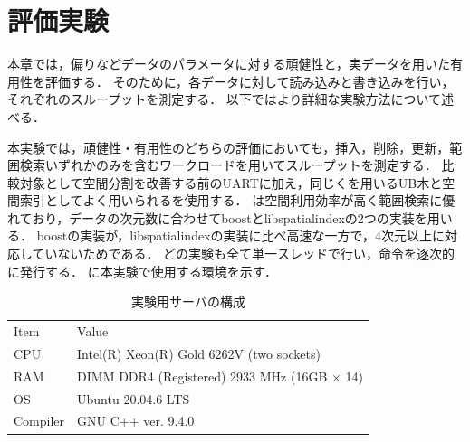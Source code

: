 \chapter{評価実験}

本章では，偏りなどデータのパラメータに対する頑健性と，実データを用いた有用性を評価する．
そのために，各データに対して読み込みと書き込みを行い，それぞれのスループットを測定する．
以下ではより詳細な実験方法について述べる．

本実験では，頑健性・有用性のどちらの評価においても，挿入，削除，更新，範囲検索いずれかのみを含むワークロードを用いてスループットを測定する．
比較対象として空間分割を改善する前のUARTに加え，同じく\ZCurve を用いるUB木と空間索引としてよく用いられる\RTree を使用する．
\RTree は空間利用効率が高く範囲検索に優れており，データの次元数に合わせてboostとlibspatialindexの2つの実装を用いる．
boostの実装が，libspatialindexの実装に比べ高速な一方で，4次元以上に対応していないためである．
どの実験も全て単一スレッドで行い，命令を逐次的に発行する．
\Tab{\ref{tab:environment}}に本実験で使用する環境を示す．

\begin{table}[tb]
  \caption{実験用サーバの構成}
  \label{tab:environment}
  \centering
  \begin{tabular}{ll}
    \toprule
    Item     & Value                                              \\
    \cmidrule(r){1-1}
    \cmidrule(l){2-2}
    CPU      & Intel(R) Xeon(R) Gold 6262V (two sockets)          \\
    RAM      & DIMM DDR4 (Registered) 2933 MHz (16GB $\times$ 14) \\
    OS       & Ubuntu 20.04.6 LTS                                 \\
    Compiler & GNU C++ ver. 9.4.0                                 \\
    \bottomrule
  \end{tabular}
\end{table}


